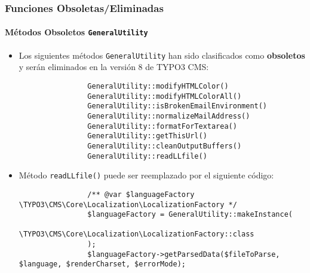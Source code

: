 \begin{frame}[fragile]
	\frametitle{Funciones Obsoletas/Eliminadas}
	\framesubtitle{Métodos Obsoletos \texttt{GeneralUtility}}

	\lstset{basicstyle=\tiny\ttfamily}

	\begin{itemize}
		\item Los siguientes métodos \texttt{GeneralUtility} han sido clasificados como \textbf{obsoletos}
			y serán eliminados en la versión 8 de TYPO3 CMS:

			\begin{lstlisting}
				GeneralUtility::modifyHTMLColor()
				GeneralUtility::modifyHTMLColorAll()
				GeneralUtility::isBrokenEmailEnvironment()
				GeneralUtility::normalizeMailAddress()
				GeneralUtility::formatForTextarea()
				GeneralUtility::getThisUrl()
				GeneralUtility::cleanOutputBuffers()
				GeneralUtility::readLLfile()
			\end{lstlisting}

		\item Método \texttt{readLLfile()} puede ser reemplazado por el siguiente código:

			\begin{lstlisting}
				/** @var $languageFactory \TYPO3\CMS\Core\Localization\LocalizationFactory */
				$languageFactory = GeneralUtility::makeInstance(
				  \TYPO3\CMS\Core\Localization\LocalizationFactory::class
				);
				$languageFactory->getParsedData($fileToParse, $language, $renderCharset, $errorMode);
			\end{lstlisting}

	\end{itemize}

\end{frame}


